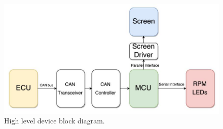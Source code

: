 \begin{figure}[H]
\begin{center}
\includegraphics[width=15cm]{Figures/block_diagram.jpg}
\end{center}
\caption{High level device block diagram.}
\label{fig:block_diagram}
\end{figure}
